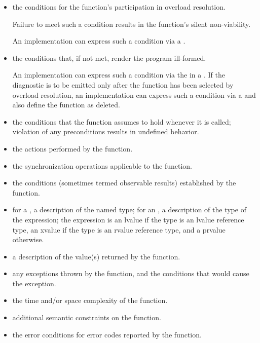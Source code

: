 \begin{itemize}
\item
\constraints
the conditions for the function's participation
in overload resolution.
\begin{note}
Failure to meet such a condition results in the function's silent non-viability.
\end{note}
\begin{example}
An implementation can express such a condition
via a .
\end{example}

\item
\mandates
the conditions that, if not met, render the program ill-formed.
\begin{example}
An implementation can express such a condition
via the 
in a .
If the diagnostic is to be emitted only after the function
has been selected by overload resolution,
an implementation can express such a condition
via a 
and also define the function as deleted.
\end{example}

\item
\expects
the conditions
that the function assumes to hold whenever it is called;
violation of any preconditions results in undefined behavior.

\item
\effects
the actions performed by the function.

\item
\sync
the synchronization operations applicable to the function.

\item
\ensures
the conditions (sometimes termed observable results)
established by the function.

\item
\result
for a , a description of the named type;
for an ,
a description of the type of the expression;
the expression is an lvalue if the type is an lvalue reference type,
an xvalue if the type is an rvalue reference type, and
a prvalue otherwise.

\item
\returns
a description of the value(s) returned by the function.

\item
\throws
any exceptions thrown by the function, and the conditions that would cause the exception.

\item
\complexity
the time and/or space complexity of the function.

\item
\remarks
additional semantic constraints on the function.

\item
\errors
the error conditions for error codes reported by the function.
\end{itemize}

